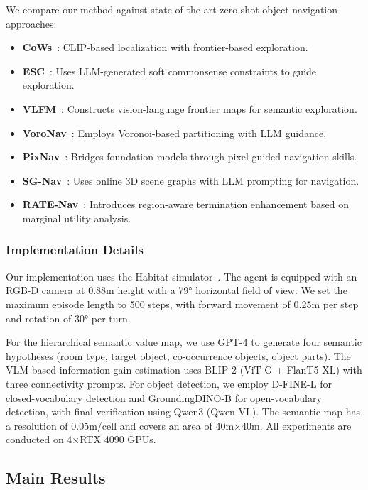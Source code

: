 \documentclass[conference]{IEEEtran}
\begin{document}
We compare our method against state-of-the-art zero-shot object navigation approaches:
\begin{itemize}
    \item \textbf{CoWs}~\cite{gadre2023cows}: CLIP-based localization with frontier-based exploration.
    \item \textbf{ESC}~\cite{zhou2023esc}: Uses LLM-generated soft commonsense constraints to guide exploration.
    \item \textbf{VLFM}~\cite{yokoyama2024vlfm}: Constructs vision-language frontier maps for semantic exploration.
    \item \textbf{VoroNav}~\cite{wu2024voronav}: Employs Voronoi-based partitioning with LLM guidance.
    \item \textbf{PixNav}~\cite{cai2024pixnav}: Bridges foundation models through pixel-guided navigation skills.
    \item \textbf{SG-Nav}~\cite{yin2024sgnav}: Uses online 3D scene graphs with LLM prompting for navigation.
    \item \textbf{RATE-Nav}~\cite{li2024ratenav}: Introduces region-aware termination enhancement based on marginal utility analysis.
\end{itemize}

\subsubsection{Implementation Details}

Our implementation uses the Habitat simulator~\cite{savva2019habitat}. The agent is equipped with an RGB-D camera at 0.88m height with a 79° horizontal field of view. We set the maximum episode length to 500 steps, with forward movement of 0.25m per step and rotation of 30° per turn. 

For the hierarchical semantic value map, we use GPT-4 to generate four semantic hypotheses (room type, target object, co-occurrence objects, object parts). The VLM-based information gain estimation uses BLIP-2 (ViT-G + FlanT5-XL) with three connectivity prompts. For object detection, we employ D-FINE-L for closed-vocabulary detection and GroundingDINO-B for open-vocabulary detection, with final verification using Qwen3 (Qwen-VL). The semantic map has a resolution of 0.05m/cell and covers an area of 40m×40m. All experiments are conducted on 4×RTX 4090 GPUs.

\subsection{Main Results}
\end{document}

